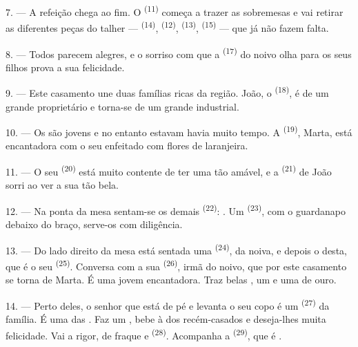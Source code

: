 7. --- A refeição chega ao fim. O  \textsuperscript{(11)} começa a
trazer as sobremesas e vai retirar as diferentes peças do talher ---
 \textsuperscript{(14)},  \textsuperscript{(12)},
 \textsuperscript{(13)},  \textsuperscript{(15)} --- que
já não fazem falta.

\VUsaut{3.0mm}

8. --- Todos parecem alegres, e o sorriso com que a 
\textsuperscript{(17)} do noivo olha para os seus filhos prova a sua
felicidade.

9. --- Este casamento une duas famílias ricas da região. João, o
 \textsuperscript{(18)}, é  de um grande
proprietário e torna-se  de um grande industrial.

10. --- Os  são jovens e no entanto estavam
 havia muito tempo. A 
\textsuperscript{(19)}, Marta, está encantadora com o seu 
enfeitado com flores de laranjeira.

11. --- O seu  \textsuperscript{(20)} está muito contente de ter uma
 tão amável, e a  \textsuperscript{(21)} de João sorri
ao ver a sua  tão bela.

12. --- Na ponta da mesa sentam-se os demais 
\textsuperscript{(22)}: . Um
 \textsuperscript{(23)}, com o guardanapo debaixo do braço,
serve-os com diligência.

\VUsaut{3.0mm}

13. --- Do lado direito da mesa está sentada uma  \textsuperscript{(24)},
 da noiva, e depois o  desta, que é o seu
 \textsuperscript{(25)}. Conversa com a sua
 \textsuperscript{(26)}, irmã do noivo, que por este
casamento se torna  de Marta. É uma jovem encantadora.
Traz belas , um  e uma
 de ouro.

14. --- Perto deles, o senhor que está de pé e levanta o seu copo é um
 \textsuperscript{(27)} da família. É uma das . Faz um , bebe à  dos recém-casados e
deseja-lhes muita felicidade. Vai a rigor, de fraque e  \textsuperscript{(28)}. Acompanha a  \textsuperscript{(29)}, que é
.

